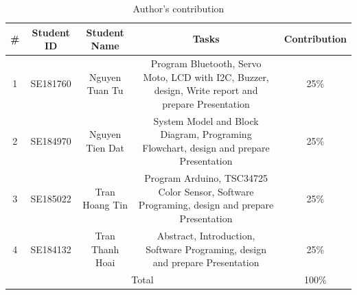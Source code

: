 \documentclass[conference, onecolumn]{IEEEtran}
\begin{document}
\begin{table}[htbp]
	\centering
	\caption{Author's contribution}
	\label{tab:my_label}
	\begin{tabular}{|c|c|c|c|c|}
		\hline
		\#&  Student ID &  Student Name &  Tasks & Contribution\\
		\hline
		1&  SE181760&  Nguyen Tuan Tu& Program Bluetooth, Servo Moto, LCD with I2C, Buzzer, design, Write report and prepare Presentation& 25\%\\
		\hline
		2&  SE184970&  Nguyen Tien Dat& System Model and Block Diagram, Programing Flowchart, design and prepare Presentation& 25\%\\
		\hline
		3&  SE185022&  Tran Hoang Tin& Program Arduino, TSC34725 Color Sensor, Software Programing, design and prepare Presentation& 25\%\\
		\hline
		4&  SE184132&  Tran Thanh Hoai& Abstract, Introduction, Software Programing, design and prepare Presentation & 25\%\\
		\hline
		\multicolumn{4}{|c|}{Total}& 100\%\\
		\hline
	\end{tabular}    
\end{table}



 

\end{document}
